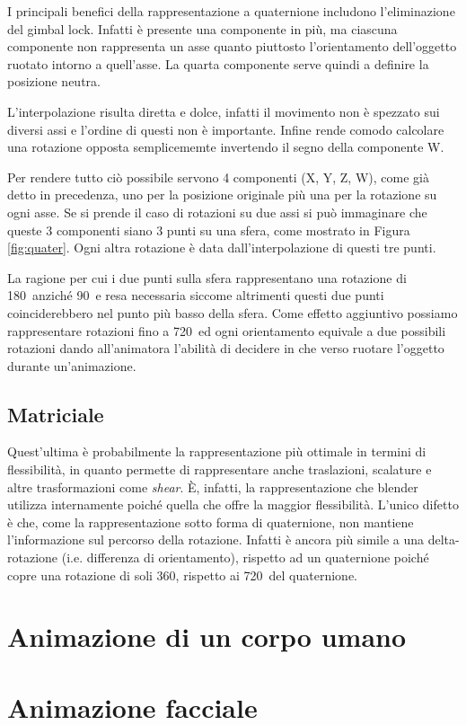 I principali benefici della rappresentazione a quaternione includono l'eliminazione del gimbal lock. Infatti è presente una componente in più, ma ciascuna componente non rappresenta un asse quanto piuttosto l'orientamento dell'oggetto ruotato intorno a quell'asse. La quarta componente serve quindi a definire la posizione neutra.

L'interpolazione risulta diretta e dolce, infatti il movimento non è spezzato sui diversi assi e l'ordine di questi non è importante. Infine rende comodo calcolare una rotazione opposta semplicememte invertendo il segno della componente W.

Per rendere tutto ciò possibile servono 4 componenti (X, Y, Z, W), come già detto in precedenza, uno per la posizione originale più una per la rotazione su ogni asse. Se si prende il caso di rotazioni su due assi si può immaginare che queste 3 componenti siano 3 punti su una sfera, come mostrato in Figura \ref{fig:quater}. Ogni altra rotazione è data dall'interpolazione di questi tre punti.

La ragione per cui i due punti sulla sfera rappresentano una rotazione di 180\textdegree\ anziché 90\textdegree\ e resa necessaria siccome altrimenti questi due punti coinciderebbero nel punto più basso della sfera. Come effetto aggiuntivo possiamo rappresentare rotazioni fino a 720\textdegree\ ed ogni orientamento equivale a due possibili rotazioni dando all'animatora l'abilità di decidere in che verso ruotare l'oggetto durante un'animazione. 

\subsection{Matriciale}
Quest'ultima è probabilmente la rappresentazione più ottimale in termini di flessibilità, in quanto permette di rappresentare anche traslazioni, scalature e altre trasformazioni come \emph{shear}. È, infatti, la rappresentazione che blender utilizza internamente \parencite{blendApi, nat2012rig} poiché quella che offre la maggior flessibilità. L'unico difetto è che, come la rappresentazione sotto forma di quaternione, non mantiene l'informazione sul percorso della rotazione. Infatti è ancora più simile a una delta-rotazione (i.e. differenza di orientamento), rispetto ad un quaternione poiché copre una rotazione di soli 360\textdegree, rispetto ai 720\textdegree\ del quaternione. 


\section{Animazione di un corpo umano}
\section{Animazione facciale}

